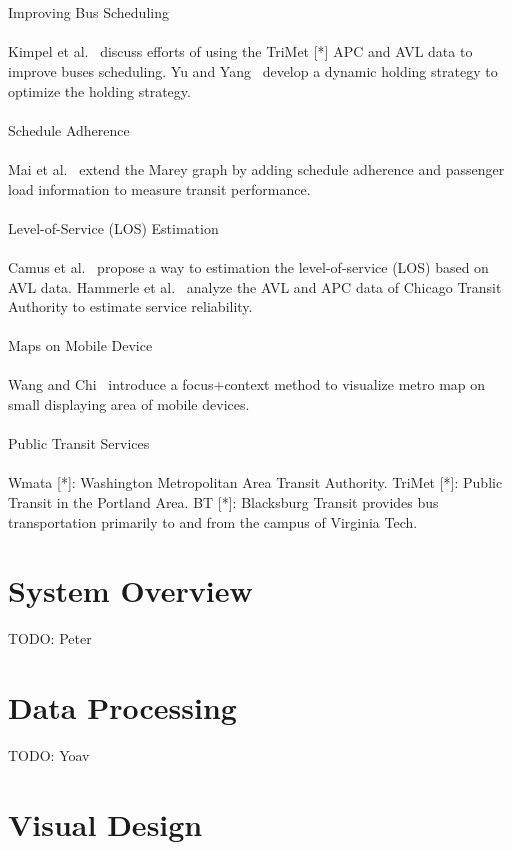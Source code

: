 \documentclass[journal]{vgtc}                %
\begin{document}
\\\\
Improving Bus Scheduling
\\\\
Kimpel et al.~\cite{4658140} discuss efforts of using the TriMet [*] APC and AVL data to improve buses scheduling.
Yu and Yang~\cite{Yu2007} develop a dynamic holding strategy to optimize the holding strategy.
\\\\
Schedule Adherence
\\\\
Mai et al.~\cite{mai2011visualizing} extend the Marey graph by adding schedule adherence and passenger load information to measure transit performance.
\\\\
Level-of-Service (LOS) Estimation
\\\\
Camus et al.~\cite{camus2005estimation} propose a way to estimation the level-of-service (LOS) based on AVL data.
Hammerle et al.~\cite{hammerle2005use} analyze the AVL and APC data of Chicago Transit Authority to estimate service reliability.
\\\\
Maps on Mobile Device
\\\\
Wang and Chi~\cite{6065020} introduce a focus+context method to visualize metro map on small displaying area of mobile devices.
\\\\
Public Transit Services
\\\\
Wmata [*]: Washington Metropolitan Area Transit Authority.
TriMet [*]: Public Transit in the Portland Area.
BT [*]: Blacksburg Transit provides bus transportation primarily to and from the campus of Virginia Tech.

\section{System Overview}
TODO: Peter

\section{Data Processing}
TODO: Yoav

\section{Visual Design}
\end{document}
